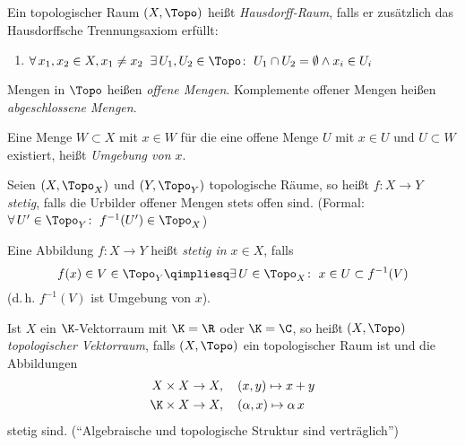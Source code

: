 Ein topologischer Raum $(X,\Topo)$ heißt \emph{Hausdorff-Raum}, falls er
zusätzlich das Hausdorffsche Trennungsaxiom erfüllt:
\begin{enumerate}[({T}4),leftmargin=2cm]
    \item
        \quad $\forall\, x_1,x_2\in X, x_1\neq x_2\;\; \exists\,
        U_1,U_2\in\Topo\colon\; U_1\cap U_2=\emptyset \wedge x_i\in U_i$
\end{enumerate}

Mengen in $\Topo$ heißen \emph{offene Mengen}. Komplemente offener Mengen heißen
\emph{abgeschlossene Mengen}.

Eine Menge $W\subset X$ mit $x\in W$ für die eine offene Menge $U$ mit $x\in U$
und $U\subset W$ existiert, heißt \emph{Umgebung von $x$}.

Seien $(X,\Topo_X)$ und $(Y,\Topo_Y)$ topologische Räume, so heißt 
\emph{$f\colon X\to Y$ stetig}, falls die Urbilder offener Mengen stets offen sind.
(Formal: $\forall\,U'\in\Topo_Y\colon\; f^{-1}(U')\in\Topo_X$)

Eine Abbildung $f\colon X\to Y$ heißt \emph{stetig in $x\in X$}, falls
\[ f(x)\in V\in\Topo_Y \qimpliesq \exists\,U\in\Topo_X\colon\; x\in U\subset
    f^{-1}(V)
\]
(d.\,h. $f^{-1}(V)$ ist Umgebung von $x$).

\begin{thEmpty}
    Ist $X$ ein $\K$-Vektorraum mit $\K=\R$ oder $\K=\C$, so heißt $(X,\Topo)$
    \emph{topologischer Vektorraum}, falls $(X,\Topo)$ ein topologischer Raum
    ist und die Abbildungen
    \begin{align*}
        X\times X  &\to X, \quad (x,y)\mapsto x+y \\
        \K\times X &\to X, \quad (\alpha,x)\mapsto \alpha \, x
    \end{align*}
    stetig sind. (\enquote{Algebraische und topologische Struktur sind
    verträglich})
\end{thEmpty}

